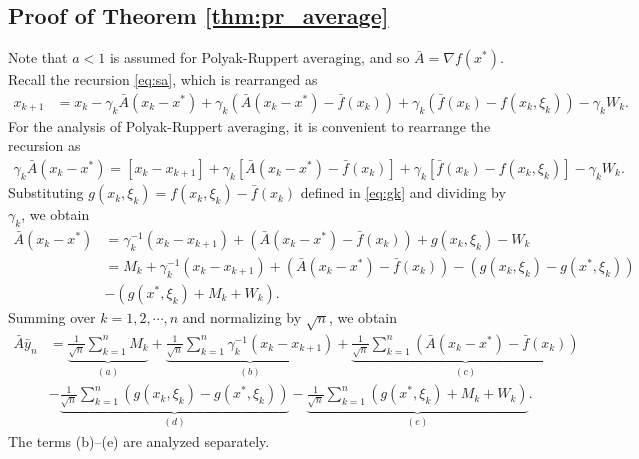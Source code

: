 \documentclass[11pt]{article}
\begin{document}
\subsection{Proof of Theorem \ref{thm:pr_average}}\label{app:pr_average}
Note that $a < 1$ is assumed for Polyak-Ruppert averaging, and so $\bar{A} = \nabla f(x^*)$. 
Recall the recursion \eqref{eq:sa}, which is rearranged as
\begin{align*}
    x_{k+1} &=
    x_k - \gamma_k \bar{A}(x_k - x^*) 
    + \gamma_k (\bar{A}(x_k - x^*) - \bar{f}(x_k))
    + \gamma_k (\bar{f}(x_k) - f(x_k, \xi_k))
    - \gamma_k W_k .
\end{align*}
For the analysis of Polyak-Ruppert averaging, it is convenient to rearrange the recursion as
\begin{align*}
    \gamma_k \bar{A} (x_k - x^*) = 
    \left[x_k - x_{k+1} \right] + \gamma_k \left[\bar{A}(x_k - x^*) - \bar{f}(x_k)  \right] 
    + \gamma_k \left[ \bar{f}(x_k) - f(x_k, \xi_k)\right]
    - \gamma_k W_k
    . 
\end{align*}
Substituting $g(x_k, \xi_k) = f(x_k, \xi_k) - \bar{f}(x_k)$ defined in \eqref{eq:gk} and dividing by $\gamma_k$, we obtain
\begin{align*}
    \bar{A}(x_k - x^*) 
    &=
    \gamma_k^{-1}(x_k - x_{k+1}) 
    + (\bar{A}(x_k - x^*) - \bar{f}(x_k))
    + g(x_k, \xi_k) 
    - W_k
    \\ &=
    M_k + \gamma_k^{-1}(x_k - x_{k+1}) 
    + (\bar{A}(x_k - x^*) - \bar{f}(x_k))
    - (g(x_k, \xi_k) - g(x^*, \xi_k))
    \\ &
    - (g(x^*, \xi_k) + M_k + W_k)
    . 
\end{align*}
Summing over $k = 1, 2, \cdots, n$ and normalizing by $\sqrt{n}$, we obtain
\begin{equation}\label{eq:pr_decomposition}
\begin{split}
    \bar{A} \bar{y}_n 
    &= 
     \underbrace{\frac{1}{\sqrt{n}} \sum_{k=1}^n M_k }_{(a)}
     +
    \underbrace{\frac{1}{\sqrt{n}}  \sum_{k=1}^{n} \gamma_k^{-1}(x_k - x_{k+1}) }_{(b)}
    + 
    \underbrace{\frac{1}{\sqrt{n}} \sum_{k=1}^n \left(\bar{A} (x_k - x^*) - \bar{f}(x_k) \right)}_{(c)}
    \\ &
    - \underbrace{\frac{1}{\sqrt{n}} \sum_{k=1}^n (g(x_k, \xi_k) - g(x^*, \xi_k))}_{(d)} 
    -
    \underbrace{\frac{1}{\sqrt{n}} \sum_{k=1}^n (g(x^*, \xi_k) + M_k + W_k)}_{(e)}
    .     
\end{split}    
\end{equation}
The terms (b)--(e) are analyzed separately. 
\end{document}
